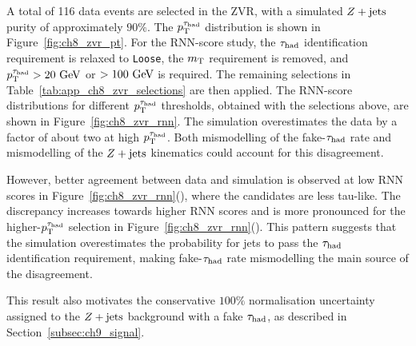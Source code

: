 A total of 116 data events are selected in the ZVR, with a simulated $Z+\mathrm{jets}$ purity of approximately $90\%$.
The $p_{\mathrm{T}}^{\tau_{\mathrm{had}}}$ distribution is shown in Figure~\ref{fig:ch8_zvr_pt}.
For the RNN-score study, the $\tau_{\mathrm{had}}$ identification requirement is relaxed to \texttt{Loose}, the $m_{\mathrm{T}}$ requirement is removed, and $p_{\mathrm{T}}^{\tau_{\mathrm{had}}}>20~\mathrm{GeV}$ or $>100~\mathrm{GeV}$ is required.
The remaining selections in Table~\ref{tab:app_ch8_zvr_selections} are then applied.
The RNN-score distributions for different $p_{\mathrm{T}}^{\tau_{\mathrm{had}}}$ thresholds, obtained with the selections above, are shown in Figure~\ref{fig:ch8_zvr_rnn}.
The simulation overestimates the data by a factor of about two at high $p_{\mathrm{T}}^{\tau_{\mathrm{had}}}$.
Both mismodelling of the fake-$\tau_{\mathrm{had}}$ rate and mismodelling of the $Z+\mathrm{jets}$ kinematics could account for this disagreement.

However, better agreement between data and simulation is observed at low RNN scores in Figure~\ref{fig:ch8_zvr_rnn}(), where the candidates are less tau-like.
The discrepancy increases towards higher RNN scores and is more pronounced for the higher-$p_{\mathrm{T}}^{\tau_{\mathrm{had}}}$ selection in Figure~\ref{fig:ch8_zvr_rnn}().
This pattern suggests that the simulation overestimates the probability for jets to pass the $\tau_{\mathrm{had}}$ identification requirement, making fake-$\tau_{\mathrm{had}}$ rate mismodelling the main source of the disagreement.

This result also motivates the conservative $100\%$ normalisation uncertainty assigned to the $Z+\mathrm{jets}$ background with a fake $\tau_{\mathrm{had}}$, as described in Section~\ref{subsec:ch9_signal}.


